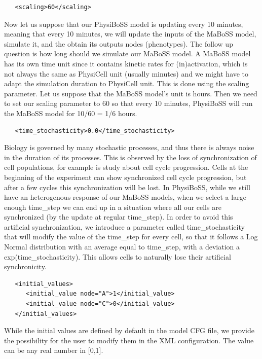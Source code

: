\documentclass[12pt]{article}
\begin{document}
\begin{verbatim}
   <scaling>60</scaling>
\end{verbatim}
Now let us suppose that our PhysiBoSS model is updating every 10 minutes, meaning that every 10 minutes, we will update the inputs of the MaBoSS model, simulate it, and the obtain its outputs nodes (phenotypes). The follow up question is how long should we simulate our MaBoSS model. A MaBoSS model has its own time unit since it contains kinetic rates for (in)activation, which is not always the same as PhysiCell unit (usually minutes) and we might have to adapt the simulation duration to PhysiCell unit. This is done using the scaling parameter. Let us suppose that the MaBoSS model's unit is hours. Then we need to set our scaling parameter to 60 so that every 10 minutes, PhysiBoSS will run the MaBoSS model for 10/60 = 1/6 hours. 

\begin{verbatim}
   <time_stochasticity>0.0</time_stochasticity>
\end{verbatim}
Biology is governed by many stochastic processes, and thus there is always noise in the duration of its processes. This is observed by the loss of synchronization of cell populations, for example is study about cell cycle progression. Cells at the beginning of the experiment can show synchronized cell cycle progression, but after a few cycles this synchronization will be lost. In PhysiBoSS, while we still have an heterogenous response of our MaBoSS models, when we select a large enough time\_step we can end up in a situation where all our cells are synchronized (by the update at regular time\_step). In order to avoid this artificial synchronization, we introduce a parameter called time\_stochasticity that will modify the value of the time\_step for every cell, so that it follows a Log Normal distribution with an average equal to time\_step, with a deviation a exp(time\_stochasticity). This allows cells to naturally lose their artificial synchronicity.

\begin{verbatim}
   <initial_values>
      <initial_value node="A">1</initial_value>
      <initial_value node="C">0</initial_value>
   </initial_values>
\end{verbatim}

While the initial values are defined by default in the model CFG file, we provide the possibility for the user to modify them in the XML configuration. The value can be any real number in [0,1].
\end{document}
